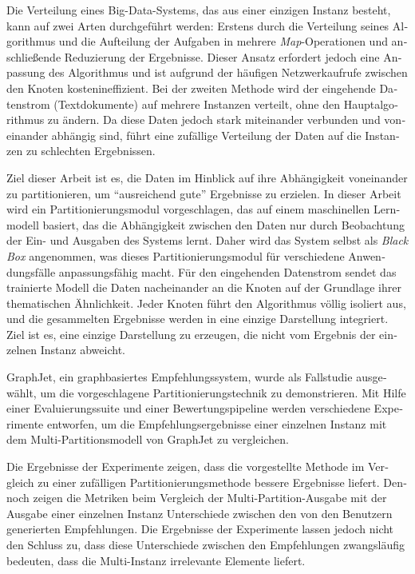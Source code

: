 \null\vfil
\begin{otherlanguage}{ngerman}
\begin{center}\textsf{\textbf{\abstractname}}\end{center}

\noindent
Die Verteilung eines Big-Data-Systems, das aus einer einzigen Instanz besteht, kann auf zwei Arten durchgeführt werden: Erstens durch die Verteilung seines Algorithmus und die Aufteilung der Aufgaben in mehrere \emph{Map}-Operationen und anschließende Reduzierung der Ergebnisse. Dieser Ansatz erfordert jedoch eine Anpassung des Algorithmus und ist aufgrund der häufigen Netzwerkaufrufe zwischen den Knoten kostenineffizient. Bei der zweiten Methode wird der eingehende Datenstrom (Textdokumente) auf mehrere Instanzen verteilt, ohne den Hauptalgorithmus zu ändern. Da diese Daten jedoch stark miteinander verbunden und voneinander abhängig sind, führt eine zufällige Verteilung der Daten auf die Instanzen zu schlechten Ergebnissen.

Ziel dieser Arbeit ist es, die Daten im Hinblick auf ihre Abhängigkeit voneinander zu partitionieren, um ``ausreichend gute'' Ergebnisse zu erzielen. In dieser Arbeit wird ein Partitionierungsmodul vorgeschlagen, das auf einem maschinellen Lernmodell basiert, das die Abhängigkeit zwischen den Daten nur durch Beobachtung der Ein- und Ausgaben des Systems lernt. Daher wird das System selbst als \emph{Black Box} angenommen, was dieses Partitionierungsmodul für verschiedene Anwendungsfälle anpassungsfähig macht. Für den eingehenden Datenstrom sendet das trainierte Modell die Daten nacheinander an die Knoten auf der Grundlage ihrer thematischen Ähnlichkeit. Jeder Knoten führt den Algorithmus völlig isoliert aus, und die gesammelten Ergebnisse werden in eine einzige Darstellung integriert. Ziel ist es, eine einzige Darstellung zu erzeugen, die nicht vom Ergebnis der einzelnen Instanz abweicht.

GraphJet, ein graphbasiertes Empfehlungssystem, wurde als Fallstudie ausgewählt, um die vorgeschlagene Partitionierungstechnik zu demonstrieren. Mit Hilfe einer Evaluierungssuite und einer Bewertungspipeline werden verschiedene Experimente entworfen, um die Empfehlungsergebnisse einer einzelnen Instanz mit dem Multi-Partitionsmodell von GraphJet zu vergleichen.


Die Ergebnisse der Experimente zeigen, dass die vorgestellte Methode im Vergleich zu einer zufälligen Partitionierungsmethode bessere Ergebnisse liefert. Dennoch zeigen die Metriken beim Vergleich der Multi-Partition-Ausgabe mit der Ausgabe einer einzelnen Instanz Unterschiede zwischen den von den Benutzern generierten Empfehlungen. Die Ergebnisse der Experimente lassen jedoch nicht den Schluss zu, dass diese Unterschiede zwischen den Empfehlungen zwangsläufig bedeuten, dass die Multi-Instanz irrelevante Elemente liefert.

\end{otherlanguage}
\vfil\null



